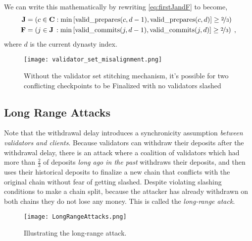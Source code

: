 \documentclass[12pt]{article}
\begin{document}
We can write this mathematically by rewriting \eqref{eq:firstJandF} to become,
\begin{equation}
\begin{split}
    \mathbf{J} &= \left( c \in \mathbf{C} : \min\left[ \textnormal{valid\_prepares}(c,d-1), \textnormal{valid\_prepares}(c,d) \right] \geq \nicefrac{2}{3} \right) \\
    \mathbf{F} &= \left( j \in \mathbf{J} \,: \min\left[\textnormal{valid\_commits}(j,d-1), \textnormal{valid\_commits}(j,d) \right] \geq \nicefrac{2}{3} \right)\; ,
\end{split}
\label{eq:secondJandF}
\end{equation}
where $d$ is the current dynasty index.


\begin{figure}[h!tb]
\centering
\texttt{[image: validator\_set\_misalignment.png]}
\caption{Without the validator set stitching mechanism, it's possible for two conflicting checkpoints to be Finalized with no validators slashed}
\label{fig:dynamic2}
\end{figure}



\subsection{Long Range Attacks}
Note that the withdrawal delay introduces a synchronicity assumption \textit{between validators and clients}. Because validators can withdraw their deposits after the withdrawal delay, there is an attack where a coalition of validators which had more than $\frac{2}{3}$ of deposits \textit{long ago in the past} withdraws their deposits, and then uses their historical deposits to finalize a new chain that conflicts with the original chain without fear of getting slashed.  Despite violating slashing conditions to make a chain split, because the attacker has already withdrawn on both chains they do not lose any money. This is called the \textit{long-range atack}.

\begin{figure}[h!tb]
\centering
\texttt{[image: LongRangeAttacks.png]}
\caption{Illustrating the long-range attack.}
\label{fig:dynamic3}
\end{figure}
\end{document}
